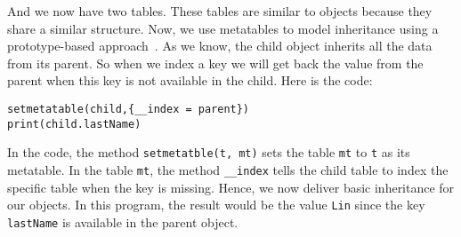 And we now have two tables. These tables are similar to objects because they share a similar structure. Now, we use metatables to model inheritance using a prototype-based approach~\cite{PIJS}. As we know, the child object inherits all the data from its parent. So when we index a key we will get back the value from the parent when this key is not available in the child. Here is the code:

\begin{verbatim}
setmetatable(child,{__index = parent}) 
print(child.lastName)
\end{verbatim}

In the code, the method {\tt setmetatble(t, mt)} sets the table {\tt mt} to {\tt t} as its metatable. In the table {\tt mt}, the method {\tt \_\_index} tells the child table to index the specific table when the key is missing. Hence, we now deliver basic inheritance for our objects. In this program, the result would be the value {\tt Lin} since the key {\tt lastName} is available in the parent object.


